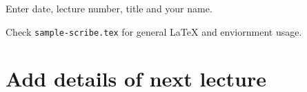 
\begin{note}
	Enter date, lecture number, title and your name. 
\end{note}

Check {\tt sample-scribe.tex} for general LaTeX and enviornment usage.



\section{Add details of next lecture}
